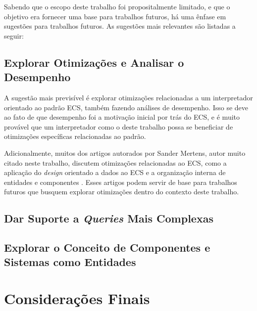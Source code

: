 




Sabendo que o escopo deste trabalho foi propositalmente limitado, e que o objetivo era fornecer uma base para trabalhos futuros, há uma ênfase em sugestões para trabalhos futuros. As sugestões mais relevantes são listadas a seguir:

\subsection{Explorar Otimizações e Analisar o Desempenho}

A sugestão mais previsível é explorar otimizações relacionadas a um interpretador orientado ao padrão ECS, também fazendo análises de desempenho. Isso se deve ao fato de que desempenho foi a motivação inicial por trás do ECS, e é muito provável que um interpretador como o deste trabalho possa se beneficiar de otimizações específicas relacionadas ao padrão.

Adicionalmente, muitos dos artigos autorados por Sander Mertens, autor muito citado neste trabalho, discutem otimizações relacionadas ao ECS, como a aplicação do \textit{design} orientado a dados ao ECS e a organização interna de entidades e componentes \cite{ecsfaq, ecsstorageinpics}. Esses artigos podem servir de base para trabalhos futuros que busquem explorar otimizações dentro do contexto deste trabalho.

\subsection{Dar Suporte a \textit{Queries} Mais Complexas}

\subsection{Explorar o Conceito de Componentes e Sistemas como Entidades}

\section{Considerações Finais}
